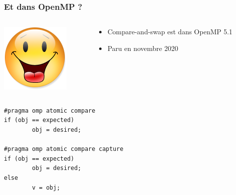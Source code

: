 \documentclass[xcolor={x11names,svgnames}]{beamer}
\begin{document}

\begin{frame}[fragile]
  \frametitle{Et dans OpenMP ?}

  \begin{columns}[b]
    \begin{column}{.1\textwidth}
      \includegraphics[width=\textwidth]{Content.png}
    \end{column}
    \begin{column}{.9\textwidth}
      \begin{itemize}
      \item Compare-and-swap est dans OpenMP 5.1
      \item Paru en novembre 2020
      \end{itemize}
    \end{column}
  \end{columns}

\bigskip
  
\begin{verbatim}
#pragma omp atomic compare
if (obj == expected)
        obj = desired;

#pragma omp atomic compare capture
if (obj == expected)
        obj = desired;
else
        v = obj;
\end{verbatim} 


\end{frame}
\end{document}
